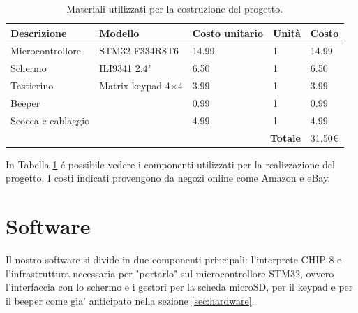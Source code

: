 \documentclass[a4paper]{article}
\begin{document}
\begin{table}[h!t] %
    \centering
    \begin{tabular}{|llll|l|}
        \hline
        \multicolumn{1}{|l|}{\textbf{Descrizione}}          & \multicolumn{1}{l|}{\textbf{Modello}}       & \multicolumn{1}{l|}{\textbf{Costo unitario}} & \textbf{Unità} & \textbf{Costo} \\ \hline
        \multicolumn{1}{|l|}{Microcontrollore}       & \multicolumn{1}{l|}{STM32 F334R8T6}         & \multicolumn{1}{l|}{14.99}                   & 1               & 14.99          \\ \hline
        \multicolumn{1}{|l|}{Schermo}                & \multicolumn{1}{l|}{ILI9341 2.4"}           & \multicolumn{1}{l|}{6.50}                    & 1               & 6.50           \\ \hline
        \multicolumn{1}{|l|}{Tastierino}          & \multicolumn{1}{l|}{Matrix keypad 4$\times$4} & \multicolumn{1}{l|}{3.99}                    & 1               & 3.99           \\ \hline
        \multicolumn{1}{|l|}{Beeper}                 & \multicolumn{1}{l|}{}                       & \multicolumn{1}{l|}{0.99}                    & 1               & 0.99           \\ \hline
        \multicolumn{1}{|l|}{Scocca e cablaggio} & \multicolumn{1}{l|}{}                       & \multicolumn{1}{l|}{4.99}                    & 1               & 4.99           \\ \hline
        \multicolumn{4}{|r|}{\textbf{Totale}}                                                      & 31.50\euro    \\ \hline
    \end{tabular}
    \caption{
        Materiali utilizzati per la costruzione del progetto.
    }
    \label{tab:components}
\end{table}

In Tabella \ref{tab:components} é possibile vedere i componenti utilizzati per la realizzazione del progetto. I costi indicati provengono da negozi online come Amazon e eBay.

\section{Software}

Il nostro software si divide in due componenti principali: l'interprete CHIP-8 e l'infrastruttura necessaria per "portarlo" sul microcontrollore STM32, ovvero l'interfaccia con lo schermo e i gestori per la scheda microSD, per il keypad e per il beeper come gia' anticipato nella sezione \ref{sec:hardware}.
\end{document}
